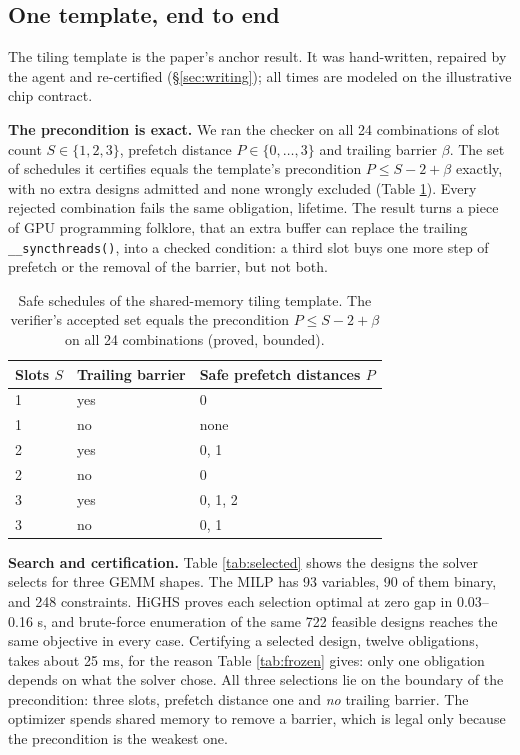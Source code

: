 \documentclass[11pt]{article}
\begin{document}
\subsection{One template, end to end}\label{sec:eval-template}

The tiling template is the paper's anchor result. It was hand-written, repaired by the agent and re-certified (§\ref{sec:writing}); all times are modeled on the illustrative chip contract.

\textbf{The precondition is exact.} We ran the checker on all 24 combinations of slot count \(S\in\{1,2,3\}\), prefetch distance \(P\in\{0,\dots,3\}\) and trailing barrier \(\beta\). The set of schedules it certifies equals the template's precondition \(P\le S-2+\beta\) exactly, with no extra designs admitted and none wrongly excluded (Table \ref{tab:safe}). Every rejected combination fails the same obligation, lifetime. The result turns a piece of GPU programming folklore, that an extra buffer can replace the trailing \texttt{\_\_syncthreads()}, into a checked condition: a third slot buys one more step of prefetch or the removal of the barrier, but not both.

\begin{table}[tb]
\small
\centering
\begin{tabular}{@{}lll@{}}
\toprule
Slots \(S\) & Trailing barrier & Safe prefetch distances \(P\) \\
\midrule
1 & yes & 0 \\
1 & no & none \\
2 & yes & 0, 1 \\
2 & no & 0 \\
3 & yes & 0, 1, 2 \\
3 & no & 0, 1 \\
\bottomrule
\end{tabular}
\caption{Safe schedules of the shared-memory tiling template. The verifier's accepted set equals the precondition \(P\le S-2+\beta\) on all 24 combinations (proved, bounded).}
\label{tab:safe}
\end{table}

\textbf{Search and certification.} Table \ref{tab:selected} shows the designs the solver selects for three GEMM shapes. The MILP has 93 variables, 90 of them binary, and 248 constraints. HiGHS proves each selection optimal at zero gap in 0.03--0.16 s, and brute-force enumeration of the same 722 feasible designs reaches the same objective in every case. Certifying a selected design, twelve obligations, takes about 25 ms, for the reason Table \ref{tab:frozen} gives: only one obligation depends on what the solver chose. All three selections lie on the boundary of the precondition: three slots, prefetch distance one and \emph{no} trailing barrier. The optimizer spends shared memory to remove a barrier, which is legal only because the precondition is the weakest one.
\end{document}
